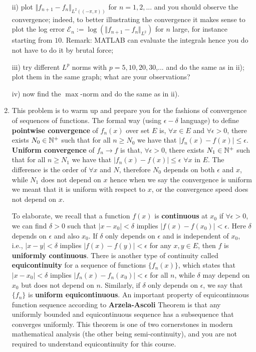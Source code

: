 \documentclass[6pt]{article}
\numberwithin{equation}{section}
\def\mathbb{\Bbb}
\begin{document}
\begin{enumerate}
ii) plot $\Vert f_{n+1} -f_n \Vert_{L^2((-\pi,\pi))}$ for $n=1,2,...$ and you should observe the convergence; indeed, to better illustrating the convergence it makes sense to plot the log error $\mathcal E_n:=\log (\Vert f_{n+1} -f_n \Vert_{L^2})$ for $n$ large, for instance starting from $10$.  Remark: MATLAB can evaluate the integrals hence you do not have to do it by brutal force;

iii) try different $L^p$ norms with $p=5,10,20,30$,... and do the same as in ii); plot them in the same graph; what are your observations?

iv) now find the $\max$-norm and do the same as in ii).

\item This problem is to warm up and prepare you for the fashions of convergence of sequences of functions.  The formal way (using $\epsilon-\delta$ language) to define \textbf{pointwise convergence} of $f_n(x)$ over set $E$ is, $\forall x\in E$ and $\forall \epsilon>0$, there exists $N_0\in\mathbb N^+$ such that for all $n\geq N_0$ we have that $\vert f_n(x)-f(x)\vert \leq \epsilon$.  \textbf{Uniform convergence} of $f_n\rightarrow f$ is that, $\forall \epsilon>0$, there exists $N_1\in\mathbb N^+$ such that for all $n\geq N_1$ we have that $\vert f_n(x)-f(x)\vert \leq \epsilon$ $\forall x$ in $E$.  The difference is the order of $\forall x$ and $N$, therefore $N_0$ depends on both $\epsilon$ and $x$, while $N_1$ does not depend on $x$ hence when we say the convergence is uniform we meant that it is uniform with respect to $x$, or the convergence speed does not depend on $x$.

To elaborate, we recall that a function $f(x)$ is \textbf{continuous} at $x_0$ if $\forall \epsilon>0$, we can find $\delta>0$ such that $\vert x-x_0\vert<\delta$ implies $\vert f(x)-f(x_0) \vert<\epsilon$.  Here $\delta$ depends on $\epsilon$ and also $x_0$.  If $\delta$ only depends on $\epsilon$ and is independent of $x_0$, i.e., $\vert x-y\vert<\delta$ implies $\vert f(x)-f(y) \vert<\epsilon$ for any $x,y\in E$, then $f$ is \textbf{uniformly continuous}.  There is another type of continuity called \textbf{equicontinuity} for a sequence of functions $\{f_n(x)\}$, which states that $\vert x-x_0\vert<\delta$ implies $\vert f_n(x)-f_n(x_0) \vert<\epsilon$ for all $n$, while $\delta$ may depend on $x_0$ but does not depend on $n$.  Similarly, if $\delta$ only depends on $\epsilon$, we say that $\{f_n\}$ is \textbf{uniform equicontinuous}.  An important property of equicontinuous function sequence according to \textbf{Arzela-Ascoli} Theorem is that any uniformly bounded and equicontinuous sequence has a subsequence that converges uniformly.  This theorem is one of two cornerstones in modern mathematical analysis (the other being semi-continuity), and you are not required to understand equicontinuity for this course.


\end{enumerate}
\end{document}
